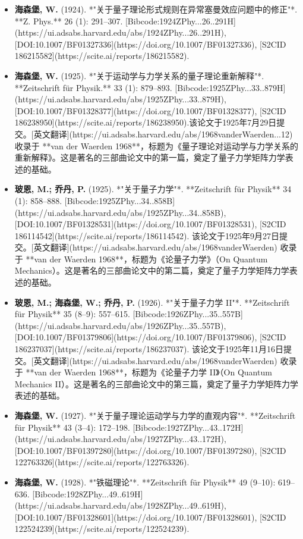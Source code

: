 \begin{itemize}
\item \textbf{海森堡, W.} (1924). *"关于量子理论形式规则在异常塞曼效应问题中的修正"*. **Z. Phys.** 26 (1): 291–307. [Bibcode:1924ZPhy...26..291H](https://ui.adsabs.harvard.edu/abs/1924ZPhy...26..291H), [DOI:10.1007/BF01327336](https://doi.org/10.1007/BF01327336), [S2CID 186215582](https://scite.ai/reports/186215582).  
\item \textbf{海森堡, W.} (1925). *"关于运动学与力学关系的量子理论重新解释"*. **Zeitschrift für Physik.** 33 (1): 879–893. [Bibcode:1925ZPhy...33..879H](https://ui.adsabs.harvard.edu/abs/1925ZPhy...33..879H), [DOI:10.1007/BF01328377](https://doi.org/10.1007/BF01328377), [S2CID 186238950](https://scite.ai/reports/186238950).该论文于1925年7月29日提交。[英文翻译](https://ui.adsabs.harvard.edu/abs/1968vanderWaerden...12) 收录于 **van der Waerden 1968**，标题为《量子理论对运动学与力学关系的重新解释》。这是著名的三部曲论文中的第一篇，奠定了量子力学矩阵力学表述的基础。
\item \textbf{玻恩, M.; 乔丹, P.} (1925). *"关于量子力学"*. **Zeitschrift für Physik** 34 (1): 858–888. [Bibcode:1925ZPhy...34..858B](https://ui.adsabs.harvard.edu/abs/1925ZPhy...34..858B), [DOI:10.1007/BF01328531](https://doi.org/10.1007/BF01328531), [S2CID 186114542](https://scite.ai/reports/186114542). 该论文于1925年9月27日提交。[英文翻译](https://ui.adsabs.harvard.edu/abs/1968vanderWaerden) 收录于 **van der Waerden 1968**，标题为《论量子力学》（On Quantum Mechanics）。这是著名的三部曲论文中的第二篇，奠定了量子力学矩阵力学表述的基础。  
\item \textbf{玻恩, M.; 海森堡, W.; 乔丹, P.} (1926). *"关于量子力学 II"*. **Zeitschrift für Physik** 35 (8–9): 557–615. [Bibcode:1926ZPhy...35..557B](https://ui.adsabs.harvard.edu/abs/1926ZPhy...35..557B), [DOI:10.1007/BF01379806](https://doi.org/10.1007/BF01379806), [S2CID 186237037](https://scite.ai/reports/186237037). 该论文于1925年11月16日提交。[英文翻译](https://ui.adsabs.harvard.edu/abs/1968vanderWaerden) 收录于 **van der Waerden 1968**，标题为《论量子力学 II》（On Quantum Mechanics II）。这是著名的三部曲论文中的第三篇，奠定了量子力学矩阵力学表述的基础。  
\item \textbf{海森堡, W.} (1927). *"关于量子理论运动学与力学的直观内容"*. **Zeitschrift für Physik** 43 (3–4): 172–198. [Bibcode:1927ZPhy...43..172H](https://ui.adsabs.harvard.edu/abs/1927ZPhy...43..172H), [DOI:10.1007/BF01397280](https://doi.org/10.1007/BF01397280), [S2CID 122763326](https://scite.ai/reports/122763326).  
\item \textbf{海森堡, W.} (1928). *"铁磁理论"*. **Zeitschrift für Physik** 49 (9–10): 619–636. [Bibcode:1928ZPhy...49..619H](https://ui.adsabs.harvard.edu/abs/1928ZPhy...49..619H), [DOI:10.1007/BF01328601](https://doi.org/10.1007/BF01328601), [S2CID 122524239](https://scite.ai/reports/122524239).  

\end{itemize}
